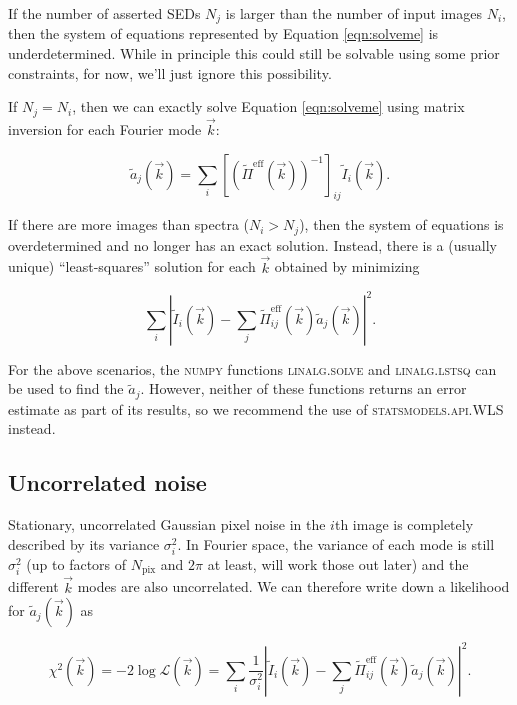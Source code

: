 \documentclass{article}
\begin{document}
If the number of asserted SEDs $N_j$ is larger than the number of input images $N_i$, then the
system of equations represented by Equation \ref{eqn:solveme} is underdetermined.  While in
principle this could still be solvable using some prior constraints, for now, we'll just ignore this
possibility.

If $N_j = N_i$, then we can exactly solve Equation \ref{eqn:solveme} using matrix inversion for each
Fourier mode $\vec{k}$:

\begin{equation}
  \tilde{a}_j(\vec{k}) = \sum_i [(\tilde{\Pi}^\mathrm{eff}(\vec{k}))^{-1}]_{ij} \tilde{I}_i(\vec{k}).
\end{equation}

If there are more images than spectra ($N_i > N_j$), then the system of equations is overdetermined
and no longer has an exact solution.  Instead, there is a (usually unique) ``least-squares''
solution for each $\vec{k}$ obtained by minimizing

\begin{equation}
  \label{eqn:lstsq}
  \sum_i\left|\tilde{I}_i(\vec{k}) - \sum_j \tilde{\Pi}^\mathrm{eff}_{ij}(\vec{k}) \tilde{a}_j(\vec{k})\right|^2.
\end{equation}

For the above scenarios, the \textsc{numpy} functions \textsc{linalg.solve} and
\textsc{linalg.lstsq} can be used to find the $\tilde{a}_j$.  However, neither of these functions
returns an error estimate as part of its results, so we recommend the use of
\textsc{statsmodels.api.WLS} instead.

\subsection{Uncorrelated noise}

Stationary, uncorrelated Gaussian pixel noise in the $i$th image is completely described by its
variance $\sigma^2_i$.  In Fourier space, the variance of each mode is still $\sigma^2_i$ (up to
factors of $N_\mathrm{pix}$ and $2 \pi$ at least, will work those out later) and the different
$\vec{k}$ modes are also uncorrelated.  We can therefore write down a likelihood for
$\tilde{a}_j(\vec{k})$ as

\begin{equation}
    \label{eqn:like}
    \chi^2(\vec{k}) = -2 \log \mathcal{L}(\vec{k}) = \sum_i\frac{1}{\sigma_i^2}\left|\tilde{I}_i(\vec{k}) - \sum_j \tilde{\Pi}^\mathrm{eff}_{ij}(\vec{k}) \tilde{a}_j(\vec{k})\right|^2.
\end{equation}
\end{document}
